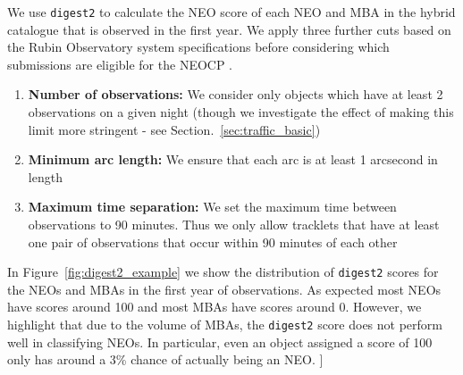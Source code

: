 \documentclass[twocolumn]{aastex631}
\newcommand{\todo}[1]{{\color{red}{[TODO: #1}]}}
\newcommand{\dig}{\texttt{digest2}}
\begin{document}
We use \dig{} to calculate the NEO score of each NEO and MBA in the hybrid catalogue that is observed in the first year. We apply three further cuts based on the Rubin Observatory system specifications before considering which submissions are eligible for the NEOCP \citep{oss}.
\begin{enumerate}
    \item \textbf{Number of observations:} We consider only objects which have at least 2 observations on a given night (though we investigate the effect of making this limit more stringent - see Section.~\ref{sec:traffic_basic})
    \item \textbf{Minimum arc length:} We ensure that each arc is at least 1 arcsecond in length
    \item \textbf{Maximum time separation:} We set the maximum time between observations to 90 minutes. Thus we only allow tracklets that have at least one pair of observations that occur within 90 minutes of each other
\end{enumerate}

In Figure~\ref{fig:digest2_example} we show the distribution of \dig{} scores for the NEOs and MBAs in the first year of observations. As expected most NEOs have scores around 100 and most MBAs have scores around 0. However, we highlight that due to the volume of MBAs, the \dig{} score does not perform well in classifying NEOs. In particular, even an object assigned a score of 100 only has around a 3\% chance of actually being an NEO. \todo{not sure if this is right place for this}
\end{document}
